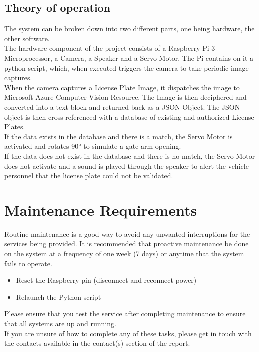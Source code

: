 \documentclass[12pt]{article}
\begin{document}
\subsection{Theory of operation}
The system can be broken down into two different parts, one being hardware, the other software.\vspace{0.5cm}\\
The hardware component of the project consists of a Raspberry Pi 3 Microprocessor, a Camera, a Speaker and a Servo Motor. The Pi contains on it a python script, which, when executed triggers the camera to take periodic image captures.\vspace{0.5cm}\\
When the camera captures a License Plate Image, it dispatches the image to Microsoft Azure Computer Vision Resource. The Image is then deciphered and converted into a text block and returned back as a JSON Object. The JSON object is then cross referenced with a database of existing and authorized License Plates.\vspace{0.5cm}\\
If the data exists in the database and there is a match, the Servo Motor is activated and rotates \ang{90} to simulate a gate arm opening.\\
If the data does not exist in the database and there is no match, the Servo Motor does not activate and a sound is played through the speaker to alert the vehicle personnel that the license plate could not be validated.
\vspace{2cm}

\section{Maintenance Requirements}
Routine maintenance is a good way to avoid any unwanted interruptions for the services being provided. It is recommended that proactive maintenance be done on the system at a frequency of one week (7 days) or anytime that the system fails to operate.
\begin{itemize}
    \item Reset the Raspberry pin (disconnect and reconnect power)
    \item Relaunch the Python script
\end{itemize}
Please ensure that you test the service after completing maintenance to ensure that all systems are up and running. \\
If you are unsure of how to complete any of these tasks, please get in touch with the contacts available in the contact(s) section of the report.
\end{document}
